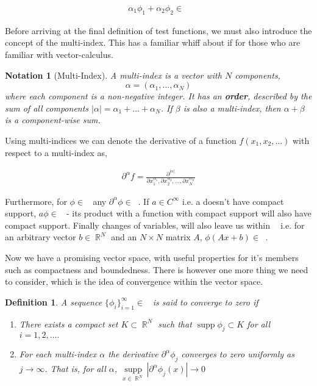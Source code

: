 \documentclass[12pt, a4]{article}
\newtheorem{definition}{Definition}[section]
\newtheorem{notation}{Notation}[section]
\DeclareMathOperator\supp{supp}
\DeclareMathOperator\reals{\mathbb{R}}
\DeclareMathOperator\tfspace{C_0^\infty}
\begin{document}
\begin{eqnarray}
    \alpha_1\phi_1 + \alpha_2\phi_2  \in \tfspace
\end{eqnarray}

Before arriving at the final definition of test functions, we must also introduce the concept of the multi-index. This has a familiar whiff about if for those who are familiar with vector-calculus.

\begin{notation}[Multi-Index]
    A multi-index is a vector with $N$ components, \[ \alpha=(\alpha_1,...,\alpha_N) \] where each component is a non-negative integer. It has an \textbf{order}, described by the sum of all components $|\alpha| = \alpha_1+...+\alpha_N$. If $\beta$ is also a multi-index, then $\alpha+\beta$ is a component-wise sum.
\end{notation}

Using multi-indices we can denote the derivative of a function $f(x_1,x_2,...)$ with respect to a multi-index as,

\begin{eqnarray}
    \partial^\alpha f = \frac{\partial^{|\alpha|}}{\partial x_1^{\alpha_1}, \partial x_2^{\alpha_2}, ..., \partial x_N^{\alpha_N}}
\end{eqnarray}

Furthermore, for $\phi \in \tfspace$ any $\partial^\alpha \phi \in \tfspace$. If $a \in C^\infty$ i.e. a doesn't have compact support, $a\phi \in \tfspace$ - its product with a function with compact support will also have compact support. Finally changes of variables, will also leave us within $\tfspace$ i.e. for an arbitrary vector $b \in \reals^N$ and an $N \times N$ matrix $A$, $\phi(Ax+b) \in \tfspace$.

Now we have a promising vector space, with useful properties for it's members such as compactness and boundedness. There is however one more thing we need to consider, which is the idea of convergence within the vector space.

\begin{definition}
    A sequence $\{\phi_i\}^\infty_{i=1} \in \tfspace $ is said to converge to zero if
    \begin{enumerate}
        \item There exists a compact set $K \subset \reals^N$ such that $\supp \phi_j \subset K$ for all $i=1,2,....$
        \item For each multi-index $\alpha$ the derivative $\partial^\alpha \phi_j$ converges to zero uniformly as $j \rightarrow \infty$. That is, for all $\alpha$, $\underset{x \in \reals^N}{\supp} |\partial^\alpha \phi_j(x)|\rightarrow 0$
    \end{enumerate}

    \label{def:convergence_of_tf}
\end{definition}
\end{document}
